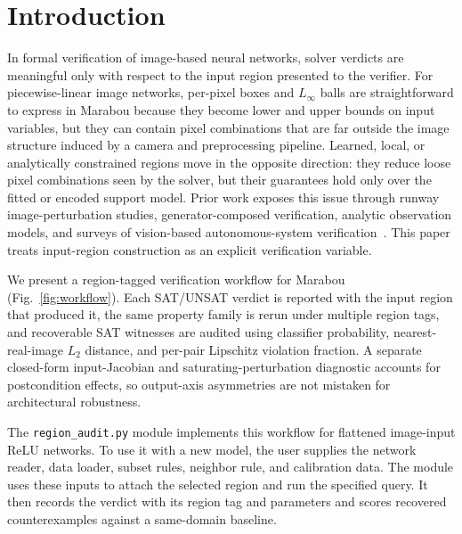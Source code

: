 \documentclass[twocolumn,smallextended,runningheads]{svjour3}
\begin{document}
\maketitle

\section{Introduction}\label{sec:introduction}

In formal verification of image-based neural networks, solver verdicts are meaningful only with respect to the input region presented to the verifier. For piecewise-linear image networks, per-pixel boxes and $L_\infty$ balls are straightforward to express in Marabou because they become lower and upper bounds on input variables, but they can contain pixel combinations that are far outside the image structure induced by a camera and preprocessing pipeline. Learned, local, or analytically constrained regions move in the opposite direction: they reduce loose pixel combinations seen by the solver, but their guarantees hold only over the fitted or encoded support model. Prior work exposes this issue through runway image-perturbation studies, generator-composed verification, analytic observation models, and surveys of vision-based autonomous-system verification~\cite{elboher2024runway,katz2022,yang2022tiler,estornell2025visual,mitra2024visionsurvey}. This paper treats input-region construction as an explicit verification variable.

We present a region-tagged verification workflow for Marabou (Fig.~\ref{fig:workflow}). Each SAT/UNSAT verdict is reported with the input region that produced it, the same property family is rerun under multiple region tags, and recoverable SAT witnesses are audited using classifier probability, nearest-real-image $L_2$ distance, and per-pair Lipschitz violation fraction. A separate closed-form input-Jacobian and saturating-perturbation diagnostic accounts for postcondition effects, so output-axis asymmetries are not mistaken for architectural robustness.

The \texttt{region\_audit.py} module implements this workflow for flattened image-input ReLU networks. To use it with a new model, the user supplies the network reader, data loader, subset rules, neighbor rule, and calibration data. The module uses these inputs to attach the selected region and run the specified query. It then records the verdict with its region tag and parameters and scores recovered counterexamples against a same-domain baseline.
\end{document}
